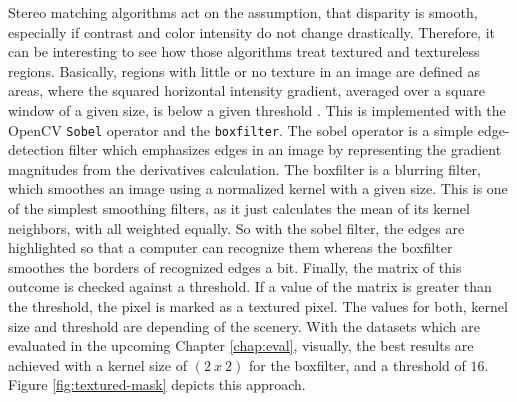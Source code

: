 Stereo matching algorithms act on the assumption, that disparity is smooth, especially if contrast and color intensity do not change drastically.
Therefore, it can be interesting to see how those algorithms treat textured and textureless regions.
Basically, regions with little or no texture in an image are defined as areas, where the squared horizontal intensity gradient, averaged over a square window of a given size, is below a given threshold \citep{scharstein2002taxonomy, cyganek2011introduction}.
\newline\newline\noindent This is implemented with the OpenCV \texttt{Sobel} operator and the \texttt{boxfilter}.
The sobel operator is a simple edge-detection filter which emphasizes edges in an image by representing the gradient magnitudes from the derivatives calculation.
The boxfilter is a blurring filter, which smoothes an image using a normalized kernel with a given size.
This is one of the simplest smoothing filters, as it just calculates the mean of its kernel neighbors, with all weighted equally.
So with the sobel filter, the edges are highlighted so that a computer can recognize them whereas the boxfilter smoothes the borders of recognized edges a bit.
Finally, the matrix of this outcome is checked against a threshold.
If a value of the matrix is greater than the threshold, the pixel is marked as a textured pixel.
\newline\newline\noindent The values for both, kernel size and threshold are depending of the scenery.
With the datasets which are evaluated in the upcoming Chapter \ref{chap:eval}, visually, the best results are achieved with a kernel size of $(2\ x\ 2)$ for the boxfilter, and a threshold of $16$.
Figure \ref{fig:textured-mask} depicts this approach.

